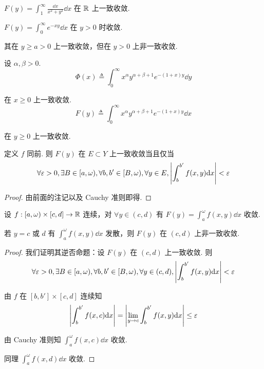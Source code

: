 \begin{example}
    $F(y)=\displaystyle\int_1^\infty\frac{\dd x}{x^2+y^2}\dd x$ 在 $\mathbb{R}$ 上一致收敛.
\end{example}

\begin{example}
    $F(y)=\displaystyle\int_0^\infty e^{-xy}\dd x$ 在 $y>0$ 时收敛.

    其在 $y\ge a>0$ 上一致收敛，但在 $y>0$ 上非一致收敛.
\end{example}

\begin{example}
    设 $\alpha,\beta>0$.
$$
\Phi(x)\triangleq\int_0^\infty x^\alpha y^{\alpha+\beta+1}e^{-(1+x)y}\dd y
$$

    在 $x\ge 0$ 上一致收敛.
$$
F(y)\triangleq\int_0^\infty x^\alpha y^{\alpha+\beta+1}e^{-(1+x)y}\dd x
$$

    在 $y\ge 0$ 上一致收敛.
\end{example}


\begin{property}
    定义 $f$ 同前. 则 $F(y)$ 在 $E\subset Y$ 上一致收敛当且仅当
$$
\forall\varepsilon>0,\exists B\in [a,\omega),\forall b,b'\in[B,\omega),\forall y\in E,\left\lvert{\int_b^{b'}f(x,y)\mathrm{d}x}\right\rvert<\varepsilon
$$
\end{property}
\begin{proof}
    由前面的注记以及 Cauchy 准则即得.
\end{proof}

\begin{inference}
    设 $f:[a,\omega)\times[c,d]\to\mathbb{R}$ 连续，对 $\forall y\in(c,d)$ 有 $F(y)=\displaystyle\int_a^\omega f(x,y)\dd x$ 收敛.

    若 $y=c$ 或 $d$ 有 $\displaystyle\int_a^\omega f(x,y)\dd x$ 发散，则 $F(y)$ 在 $(c,d)$ 上非一致收敛.
\end{inference}
\begin{proof}
    我们证明其逆否命题：设 $F(y)$ 在 $(c,d)$ 上一致收敛. 则
$$
\forall\varepsilon>0,\exists B\in[a,\omega),\forall b,b'\in[B,\omega),\forall y\in(c,d),\left\lvert{\int_b^{b'}f(x,y)\mathrm{d}x}\right\rvert<\varepsilon
$$

    由 $f$ 在 $[b,b']\times [c,d]$ 连续知
$$
\left\lvert{\int_b^{b'}f(x,c)\mathrm{d}x}\right\rvert=\left\lvert{\lim_{y\to c}\int_b^{b'}f(x,y)\mathrm{d}x}\right\rvert\le\varepsilon
$$

    由 Cauchy 准则知 $\displaystyle\int_a^\omega f(x,c)\dd x$ 收敛.

    同理 $\displaystyle\int_a^\omega f(x,d)\dd x$ 收敛.
\end{proof}


